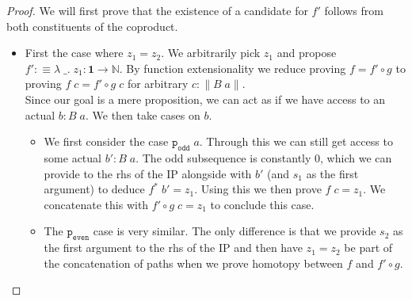 \documentclass[12pt]{report}
\begin{document}
\begin{proof}
We will first prove that the existence of a candidate for $f'$ follows from both constituents of the coproduct.
\begin{itemize}
\item First the case where $z_1= z_2$. 
We arbitrarily pick $z_1$ and propose $f' : \equiv \lambda \;\_.\; z_1 : \mathbf{1} \rightarrow \mathbb{N}$. 
By function extensionality we reduce proving $f= f' \circ g$ to proving $f\; c = f'\circ g\; c$ for arbitrary $c : \lVert B\; a\rVert$. \\
Since our goal is a mere proposition, we can act as if we have access to an actual $b : B\; a$. 
We then take cases on $b$.  
\begin{itemize}
\item We first consider the case $\mathtt{p_{odd}}\; a$. 
Through this we can still get access to some actual $b' : B\; a$. 
The odd subsequence is constantly $0$, which we can provide to the rhs of the IP alongside with $b'$ (and $s_1$ as the first argument) to deduce $f^*\; b' = z_1$. 
Using this we then prove $f\; c = z_1$. 
We concatenate this with $f' \circ g \; c = z_1$ to conclude this case. 
\item The $\mathtt{p_{even}}$ case is very similar. 
The only difference is that we provide $s_2$ as the first argument to the rhs of the IP and then have $z_1=z_2$ be part of the concatenation of paths when we prove homotopy between $f$ and $f' \circ g$. 
\end{itemize}


\end{itemize}
\end{proof}
\end{document}
